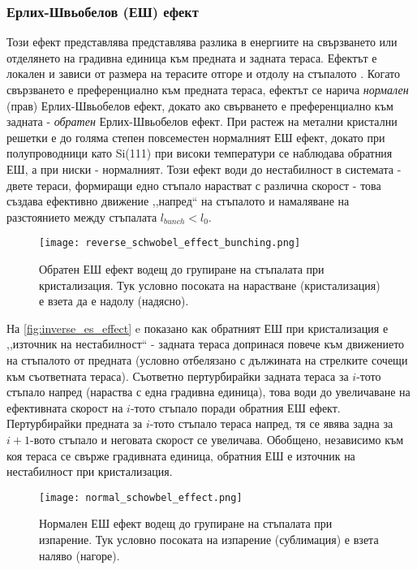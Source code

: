 \subsubsection{Ерлих-Швьобелов (ЕШ) ефект}
Този ефект представлява представлява разлика в енергиите на свързването или отделянето на градивна единица към предната и задната тераса. Ефектът е локален и зависи от размера на терасите
отгоре и отдолу на стъпалото \cite{Krug2005}. Когато свързването е преференциално към предната тераса, ефектът се нарича \textit{нормален} (прав) Ерлих-Швьобелов ефект,  докато ако свърването е преференциално към задната - \textit{обратен} Ерлих-Швьобелов ефект. При растеж на метални кристални решетки е до голяма степен повсеместен нормалният ЕШ ефект, докато при полупроводници като Si(111) при високи температури се наблюдава обратния ЕШ, а при ниски - нормалният.
Този ефект води до нестабилност в системата - двете тераси, формиращи едно стъпало нарастват с различна скорост - това създава ефективно движение ,,напред`` на стъпалото и намаляване на разстоянието между стъпалата $l_{bunch} < l_0$.
\begin{figure}[htbp]
	\centering
	\texttt{[image: reverse\_schwobel\_effect\_bunching.png]}
	\caption{Обратен ЕШ ефект водещ до групиране на стъпалата при кристализация. Тук условно посоката на нарастване (кристализация) е взета да е надолу (надясно).}
	\label{fig:inverse_es_effect}
\end{figure}

На \autoref{fig:inverse_es_effect} e показано как обратният ЕШ при кристализация е ,,източник на нестабилност`` - задната тераса допринася повече към движението на стъпалото от предната (условно отбелязано с дължината на стрелките сочещи към съответната тераса). Съответно пертурбирайки задната тераса за $i$-тото стъпало напред (нараства с една градивна единица), това води до увеличаване на ефективната скорост на $i$-тото стъпало поради обратния ЕШ ефект. Пертурбирайки предната за $i$-тото стъпало тераса напред, тя се явява задна за $i+1$-вото стъпало и неговата скорост се увеличава. Обобщено, независимо към коя тераса се свърже градивната единица, обратния ЕШ е източник на нестабилност при кристализация.
\begin{figure}[htbp]
	\centering
	\texttt{[image: normal\_schowbel\_effect.png]}
	\caption{Нормален ЕШ ефект водещ до групиране на стъпалата при изпарение. Тук условно посоката на изпарение (сублимация) е взета наляво (нагоре).}
	\label{fig:normal_es_effect}
\end{figure}

